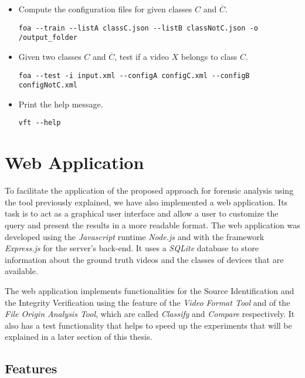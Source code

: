 \begin{itemize}

\item Compute the configuration files for given classes $C$ and $\overline{C}$.
\begin{lstlisting}
foa --train --listA classC.json --listB classNotC.json -o /output_folder
\end{lstlisting}

\item Given two classes $C$ and $\overline{C}$, test if a video $X$ belongs to class $C$.
\begin{lstlisting}
foa --test -i input.xml --configA configC.xml --configB configNotC.xml
\end{lstlisting}

\item Print the help message.
\begin{lstlisting}
vft --help
\end{lstlisting}

\end{itemize}

\section{Web Application}

To facilitate the application of the proposed approach for forensic analysis using the tool previously explained, we have also implemented a web application. Its task is to act as a graphical user interface and allow a user to customize the query and present the results in a more readable format. The web application was developed using the \emph{Javascript} runtime \emph{Node.js} \cite{node} and with the framework \emph{Express.js} \cite{express} for the server's back-end. It uses a \emph{SQLite} database to store information about the ground truth videos and the classes of devices that are available.

The web application implements functionalities for the Source Identification and the Integrity Verification using the feature of the \emph{Video Format Tool} and of the \emph{File Origin Analysis Tool}, which are called \emph{Classify} and \emph{Compare} respectively.
It also has a test functionality that helps to speed up the experiments that will be explained in a later section of this thesis.

\subsection{Features}

